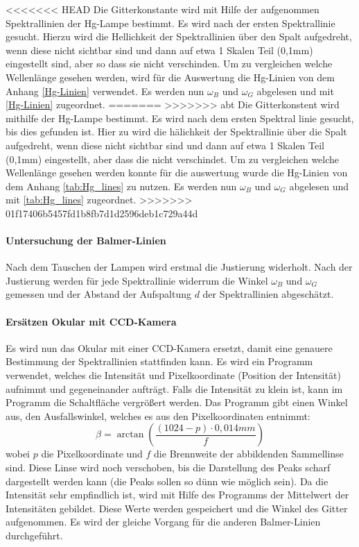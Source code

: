 <<<<<<< HEAD
Die Gitterkonstante wird mit Hilfe der aufgenommen Spektrallinien der Hg-Lampe bestimmt.
Es wird nach der ersten Spektrallinie gesucht. 
Hierzu wird die Hellichkeit der Spektrallinien über den Spalt aufgedreht, wenn diese nicht sichtbar sind und dann auf etwa 1 Skalen Teil (0,1mm) eingestellt sind, aber so dass sie nicht verschinden.
Um zu vergleichen welche Wellenlänge gesehen werden, wird für die Auswertung die Hg-Linien von dem Anhang \cref{Hg-Linien} verwendet.
Es werden nun $\omega_B$ und $\omega_G$ abgelesen und mit \cref{Hg-Linien} zugeordnet.
=======
>>>>>>> abt
Die Gitterkonstent wird mithilfe der Hg-Lampe bestimmt.
Es wird nach dem ersten Spektral linie gesucht, bis dies gefunden ist. 
Hier zu wird die hälichkeit der Spektrallinie über die Spalt aufgedreht, wenn diese nicht sichtbar sind und dann auf etwa 1 Skalen Teil (0,1mm) eingestellt, aber dass die nicht verschindet.
Um zu vergleichen welche Wellenlänge gesehen werden konnte für die auswertung wurde die Hg-Linien von dem Anhang \cref{tab:Hg_lines} zu nutzen.
Es werden nun $\omega_B$ und $\omega_G$ abgelesen und mit \cref{tab:Hg_lines} zugeordnet.
>>>>>>> 01f17406b5457fd1b8fb7d1d2596deb1c729a44d

\paragraph{Untersuchung der Balmer-Linien}
Nach dem Tauschen der Lampen wird erstmal die Justierung widerholt. 
Nach der Justierung werden für jede Spektrallinie widerrum die Winkel $\omega_B$ und $\omega_G$ gemessen und der Abstand der Aufspaltung $d$ der Spektrallinien abgeschätzt.

\paragraph{Ersätzen Okular mit CCD-Kamera}
Es wird nun das Okular mit einer CCD-Kamera ersetzt, damit eine genauere Bestimmung der Spektrallinien stattfinden kann. 
Es wird ein Programm verwendet, welches die Intensität und Pixelkoordinate (Position der Intensität) aufnimmt und gegeneinander aufträgt. 
Falls die Intensität zu klein ist, kann im Programm die Schaltfläche vergrößert werden.
Das Programm gibt einen Winkel aus, den Ausfallswinkel, welches es aus den Pixelkoordinaten entnimmt: 
\begin{equation}
    \beta = \arctan(\frac{(1024-p)\cdot0,014mm}{f})
\end{equation}
wobei $p$ die Pixelkoordinate und $f$ die Brennweite der abbildenden Sammellinse sind.
Diese Linse wird noch verschoben, bis die Darstellung des Peaks scharf dargestellt werden kann (die Peaks sollen so dünn wie möglich sein).
Da die Intensität sehr empfindlich ist, wird mit Hilfe des Programms der Mittelwert der Intensitäten gebildet. 
Diese Werte werden gespeichert und die Winkel des Gitter aufgenommen. 
Es wird der gleiche Vorgang für die anderen Balmer-Linien durchgeführt.


